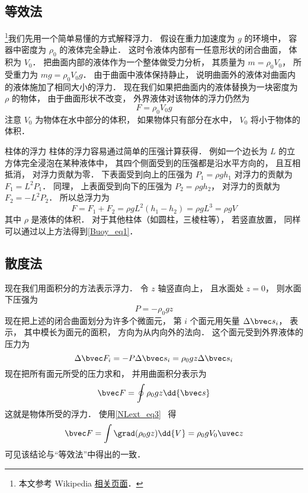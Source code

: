 
\subsection{等效法}

\footnote{本文参考 Wikipedia \href{https://en.wikipedia.org/wiki/Archimedes'_principle}{相关页面}．}我们先用一个简单易懂的方式解释浮力． 假设在重力加速度为 $g$ 的环境中， 容器中密度为 $\rho_0$ 的液体完全静止． 这时令液体内部有一任意形状的闭合曲面， 体积为 $V_0$． 把曲面内部的液体作为一个整体做受力分析， 其质量为 $m = \rho_0 V_0$， 所受重力为 $mg = \rho_0 V_0 g$． 由于曲面中液体保持静止， 说明曲面外的液体对曲面内的液体施加了相同大小的浮力． 现在我们如果把曲面内的液体替换为一块密度为 $\rho$ 的物体， 由于曲面形状不改变， 外界液体对该物体的浮力仍然为
\begin{equation}\label{Buoy_eq1}
F = \rho_0 V_0 g
\end{equation}
注意 $V_0$ 为物体在水中部分的体积， 如果物体只有部分在水中， $V_0$ 将小于物体的体积．

\begin{example}{柱体的浮力}
柱体的浮力容易通过简单的压强计算获得． 例如一个边长为 $L$ 的立方体完全浸泡在某种液体中， 其四个侧面受到的压强都是沿水平方向的， 且互相抵消， 对浮力贡献为零． 下表面受到向上的压强为 $P_1 = \rho g h_1$ 对浮力的贡献为 $F_1 = L^2 P_1$． 同理， 上表面受到向下的压强为 $P_2 = \rho g h_2$， 对浮力的贡献为 $F_2 = -L^2 P_2$． 所以总浮力为
\begin{equation}
F = F_1 + F_2 = \rho g L^2 (h_1 - h_2) = \rho g L^3 = \rho g V
\end{equation}
其中 $\rho$ 是液体的体积． 对于其他柱体（如圆柱，三棱柱等）， 若竖直放置， 同样可以通过以上方法得到\autoref{Buoy_eq1}．
\end{example}

\subsection{散度法}

现在我们用面积分的方法表示浮力． 令 $z$ 轴竖直向上， 且水面处 $z = 0$， 则水面下压强为
\begin{equation}
P = -\rho_0 g z
\end{equation}
现在把上述的闭合曲面划分为许多个微面元， 第 $i$ 个面元用矢量 $\Delta \bvec s_i$， 表示， 其中模长为面元的面积， 方向为从内向外的法向． 这个面元受到外界液体的压力为
\begin{equation}
\Delta \bvec F_i = -P\Delta \bvec s_i = \rho_0 g z \Delta \bvec s_i
\end{equation}
现在把所有面元所受的压力求和， 并用曲面积分表示为
\begin{equation}
\bvec F = \oint \rho_0 g z \dd{\bvec s}
\end{equation}
这就是物体所受的浮力． 使用\autoref{NLext_eq3}~ 得
\begin{equation}
\bvec F = \int \grad(\rho_0 g z) \dd{V} = \rho_0 g V_0 \uvec z
\end{equation}
可见该结论与“等效法”中得出的一致．
